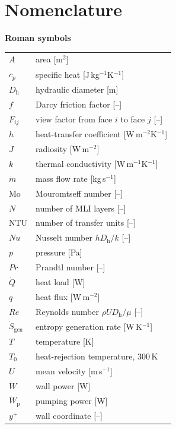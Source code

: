 \documentclass[preprint,12pt]{elsarticle}
\renewcommand{\Re}{\mathit{Re}}
\newcommand{\Nu}{\mathit{Nu}}
\renewcommand{\Pr}{\mathit{Pr}}
\begin{document}
\section*{Nomenclature}
{\footnotesize
\noindent\begin{minipage}[t]{0.52\textwidth}
\textbf{Roman symbols}\\[2pt]
\begin{tabular}{@{}p{1.2cm}>{\raggedright\arraybackslash}p{5.0cm}@{}}
$A$ & area [m$^2$] \\
$c_p$ & specific heat [J\,kg$^{-1}$K$^{-1}$] \\
$D_{\mathrm h}$ & hydraulic diameter [m] \\
$f$ & Darcy friction factor [--] \\
$F_{ij}$ & view factor from face $i$ to face $j$ [--] \\
$h$ & heat-transfer coefficient [W\,m$^{-2}$K$^{-1}$] \\
$J$ & radiosity [W\,m$^{-2}$] \\
$k$ & thermal conductivity [W\,m$^{-1}$K$^{-1}$] \\
$\dot m$ & mass flow rate [kg\,s$^{-1}$] \\
$\mathrm{Mo}$ & Mouromtseff number [--] \\
$N$ & number of MLI layers [--] \\
$\mathrm{NTU}$ & number of transfer units [--] \\
$\Nu$ & Nusselt number $hD_{\mathrm h}/k$ [--] \\
$p$ & pressure [Pa] \\
$\Pr$ & Prandtl number [--] \\
$\dot Q$ & heat load [W] \\
$q$ & heat flux [W\,m$^{-2}$] \\
$\Re$ & Reynolds number $\rho U D_{\mathrm h}/\mu$ [--] \\
$\dot S_{\mathrm{gen}}$ & entropy generation rate [W\,K$^{-1}$] \\
$T$ & temperature [K] \\
$T_0$ & heat-rejection temperature, 300\,K \\
$U$ & mean velocity [m\,s$^{-1}$] \\
$\dot W$ & wall power [W] \\
$\dot W_{\mathrm p}$ & pumping power [W] \\
$y^+$ & wall coordinate [--] \\
\end{tabular}

\end{minipage}}
\end{document}
